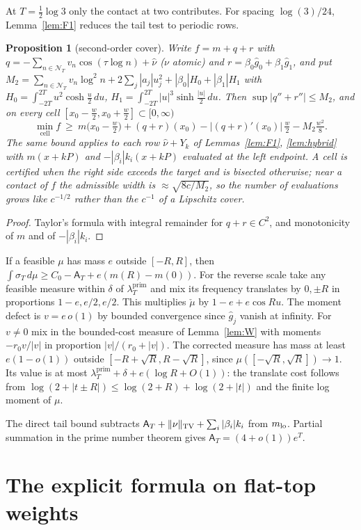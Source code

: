 \documentclass[10pt]{amsart}
\newtheorem{proposition}[theorem]{Proposition}
\theoremstyle{definition}
\theoremstyle{remark}
\newcommand{\lamP}{\lambda^{\mathrm{prim}}_T}
\newcommand{\sT}{\sigma_T}
\newcommand{\gh}[1]{\widehat g_{#1}}
\newcommand{\nuh}{\widehat\nu}
\newcommand{\NT}{\mathcal N_T}
\newcommand{\Aconst}{\mathsf A_T}
\begin{document}
At $T=\tfrac12\log3$ only the contact at two contributes. For spacing
$\log(3)/24$, Lemma~\ref{lem:F1} reduces the tail test to periodic rows.

\begin{proposition}[second-order cover]\label{prop:TAY}
Write $f=m+q+r$ with $q=-\sum_{n\in\NT}v_n\cos(\tau\log n)+\nuh$ ($\nu$ atomic) and
$r=\beta_0\gh0+\beta_1\gh1$, and put
$M_2=\sum_{n\in\NT}v_n\log^2n+2\sum_j|a_j|u_j^2+|\beta_0|H_0+|\beta_1|H_1$ with
$H_0=\int_{-2T}^{2T}u^2\cosh\frac u2\,du$, $H_1=\int_{-2T}^{2T}|u|^3\sinh\frac{|u|}2\,du$. Then
$\sup|q''+r''|\le M_2$, and on every cell $[x_0-\frac w2,x_0+\frac w2]\subset[0,\infty)$
\[
\min_{\text{cell}}f\ \ge\ m\!\big(x_0-\tfrac w2\big)+(q+r)(x_0)-|(q+r)'(x_0)|\,\tfrac w2-M_2\tfrac{w^2}8 .
\]
The same bound applies to each row $\nuh+Y_k$ of Lemmas~\ref{lem:F1}, \ref{lem:hybrid} with
$m(x+kP)$ and $-|\beta_i|k_i(x+kP)$ evaluated at the left endpoint. A cell is certified when the
right side exceeds the target and is bisected otherwise; near a contact of $f$ the admissible width
is $\approx\sqrt{8c/M_2}$, so the number of evaluations grows like $c^{-1/2}$ rather than the
$c^{-1}$ of a Lipschitz cover.
\end{proposition}
\begin{proof}
Taylor's formula with integral remainder for $q+r\in C^2$, and monotonicity of $m$ and of
$-|\beta_i|k_i$.
\end{proof}



If a feasible $\mu$ has mass $e$ outside $[-R,R]$, then
$\int\sT\,d\mu\ge C_0-\Aconst+e(m(R)-m(0))$. For the reverse scale
take any feasible measure within $\delta$ of $\lamP$ and mix its
frequency translates by $0,\pm R$ in proportions $1-e,e/2,e/2$.
This multiplies $\check\mu$ by $1-e+e\cos Ru$. The moment defect is
$v=e\,o(1)$ by bounded convergence since $\gh j$ vanish at infinity.
For $v\ne0$ mix in the bounded-cost measure of Lemma~\ref{lem:W}
with moments $-r_0v/|v|$ in proportion $|v|/(r_0+|v|)$.
The corrected measure has mass at least $e(1-o(1))$ outside
$[-R+\sqrt R,R-\sqrt R]$, since $\mu([-\sqrt R,\sqrt R])\to1$.
Its value is at most $\lamP+\delta+e(\log R+O(1))$: the translate
cost follows from $\log(2+|t\pm R|)\le\log(2+R)+\log(2+|t|)$
and the finite log moment of $\mu$.

The direct tail bound subtracts $\Aconst+\|\nu\|_{\rm TV}
+\sum_i|\beta_i|k_i$ from $m_{\rm lo}$. Partial summation in the prime
number theorem gives $\Aconst=(4+o(1))e^T$.

\section{The explicit formula on flat-top weights}\label{sec:Z}
\end{document}
